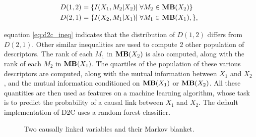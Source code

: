 \begin{align}
    D(1, 2)&=\{I(X_1, M_2 | X_2)|\;\forall M_2\in\textbf{MB}(X_2)\}\\
    D(2, 1)&=\{I(X_2, M_1 | X_1)|\;\forall M_1\in\textbf{MB}(X_1),\},
\end{align}

equation \ref{eq:d2c_ineq} indicates that the distribution of $D(1, 2)$ differs
from $D(2, 1)$. Other similar inequalities are used to compute 2 other
population of descriptors. The rank of each $M_1$ in $\textbf{MB}(X_2)$ is also
computed, along with the rank of each $M_2$ in $\textbf{MB}(X_1)$. The quartiles of the
population of these various descriptors are computed, along with the
mutual information between $X_1$ and $X_2$, and the mutual information
conditioned on $\textbf{MB}(X_1)$ or $\textbf{MB}(X_2)$. All these quantities are then used as
features on a machine learning algorithm, whose task is to predict the
probability of a causal link between $X_1$ and $X_2$. The default implementation
of D2C uses a random forest classifier.

\begin{figure}
    \centering
    \caption{Two causally linked variables and their Markov blanket.}
    \label{fig:d2c_mb}
\end{figure}

